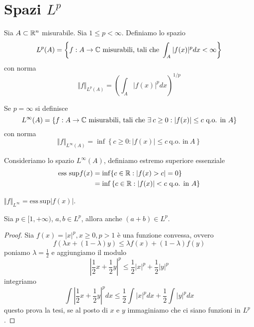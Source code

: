 \section{Spazi $L^{p}$}

\begin{defn}
[Spazio $L^{p}$] Sia $A\subset \mathbb{R}^{n}$ misurabile. Sia $1\leq p < \infty $. Definiamo lo spazio
\begin{equation*}
L^{p}(A) = \left\{f: A\rightarrow \mathbb{C} \ \text{misurabili, tali che} \ \int_{A}| f(x)|^{p} dx < \infty \right\}
\end{equation*}
con norma
\begin{equation*}
\Vert f \Vert_{L^{p}(A)} = \left(\int_{A}| f(x)|^{p} dx\right)^{1/p}
\end{equation*}
\end{defn}
\begin{defn}
Se $p = \infty $ si definisce
\begin{equation*}
L^{\infty}(A) = \left\{f: A\rightarrow \CC \ \text{misurabili, tali che} \ \exists c\geq 0: | f(x)| \leq c\ \text{q.o. in} \ A\right\}
\end{equation*}
con norma
\begin{equation*}
\Vert f \Vert_{L^{\infty}(A)} = \inf\left\{c\geq 0: | f(x)| \leq c\ \text{q.o. in} \ A\right\}
\end{equation*}
\end{defn}
\begin{defn}
Consideriamo lo spazio $L^{\infty}(A)$, definiamo estremo superiore essenziale
\begin{equation*}
\begin{aligned}
\mathrm{ess\ sup} f(x) & = \inf\{c\in \mathbb{R} : | f(x) > c| = 0\}\\
 & = \inf\left\{c\in \mathbb{R} : | f(x)| < c\ \text{q.o. in} \ A\right\}
\end{aligned}
\end{equation*}
\end{defn}
\begin{rem}
$ \Vert f \Vert_{L^{\infty}} = \mathrm{ess\ sup}| f(x)| $.
\end{rem}
\begin{thm}
Sia $p\in [1, + \infty)$, $a, b\in L^{p}$, allora anche $(a + b) \in L^{p}$.
\end{thm}
\begin{proof}

Sia $f(x) =| x|^{p}, x\geq 0, p > 1$ è una funzione convessa, ovvero
\begin{equation*}
f(\lambda x + (1 - \lambda) y) \leq \lambda f(x) + (1 - \lambda) f(y)
\end{equation*}
poniamo $\lambda = \frac{1}{2}$ e aggiungiamo il modulo
\begin{equation*}
\left| \frac{1}{2} x + \frac{1}{2} y\right|^{p} \leq \frac{1}{2}| x|^{p} + \frac{1}{2}| y|^{p}
\end{equation*}
integriamo
\begin{equation*}
\int \left| \frac{1}{2} x + \frac{1}{2} y\right|^{p} dx\leq \frac{1}{2}\int | x|^{p} dx + \frac{1}{2}\int | y|^{p} dx
\end{equation*}
questo prova la tesi, se al posto di $x$ e $y$ immaginiamo che ci siano funzioni in $L^{p}$.
\end{proof}
